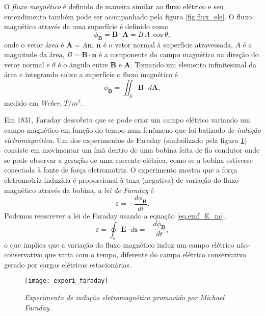 O \textit{fluxo magnético} é definido de maneira similar ao fluxo elétrico e seu entendimento também pode ser acompanhado pela figura \ref{fig.flux_ele}. O fluxo magnético através de uma superfície é definido como
\begin{equation*}
\phi_\mathbf{B}=\textbf{B}\cdot\textbf{A}=B\,A\,\cos\theta,
\end{equation*}
onde o vetor área é $\textbf{A}=A\textbf{n}$, $\textbf{n}$ é o vetor normal à superfície atravessada, $A$ é a magnitude da área, $B=\textbf{B}\cdot\textbf{n}$ é a componente do campo magnético na direção do vetor normal e $\theta$ é o ângulo entre $\textbf{B}$ e $\textbf{A}$. Tomando um elemento infinitesimal da área e integrando sobre a superfície o fluxo magnético é
\begin{equation}\label{eq.fluxo_mag}
\phi_{\mathbf{B}}=\iint_S\mathbf{B}\cdot d\mathbf{A},
\end{equation}
medido em \textit{Weber}, $T/m^2$. 

Em 1831, Faraday descobriu que se pode criar um campo elétrico variando um campo magnético em função do tempo num fenômeno que foi batizado de \textit{indução eletromagnética}. Um dos experimentos de Faraday (simbolizado pela figura \ref{fig.exper_faraday}) consiste em movimentar um ímã dentro de uma bobina feita de fio condutor onde se pode observar a geração de uma corrente elétrica, como se a bobina estivesse conectada \`a fonte de força eletromotriz. O experimento mostra que a força eletromotriz induzida é proporcional à taxa (negativa) de variação do fluxo magnético através da bobina, a \textit{lei de Faraday} é
\begin{equation*}
\varepsilon=-\frac{d\phi_\mathbf{B}}{dt}.
\end{equation*}
Podemos reescrever a lei de Faraday usando a equação \ref{eq.emf_E_nc},
\begin{equation}\label{eq.lei_faraday}
\varepsilon=\oint_s\pmb{E}\cdot d\pmb{s}=-\frac{d\phi_\mathbf{B}}{dt},
\end{equation}
o que implica que a variação do fluxo magnético induz um campo elétrico não-conservativo que varia com o tempo, diferente do campo elétrico conservativo gerado por cargas elétricas estacionárias.

\begin{figure}[!htb]
\centering
\texttt{[image: experi\_faraday]}
\caption{\textit{Experimento de indução eletromagnética promovido por Michael Faraday.}}
\label{fig.exper_faraday}
\end{figure}


